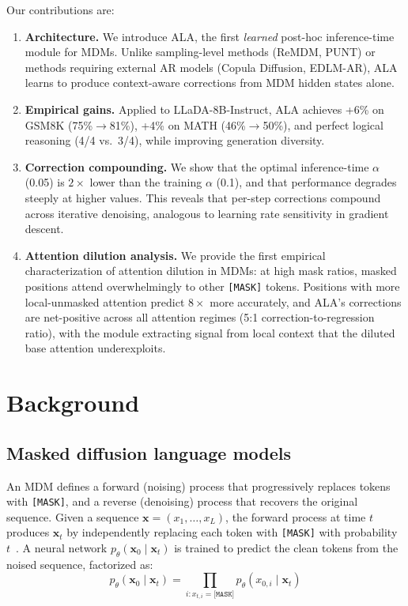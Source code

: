 \documentclass{article} %
\begin{document}
Our contributions are:
\begin{enumerate}
    \item \textbf{Architecture.} We introduce ALA, the first \emph{learned} post-hoc inference-time module for MDMs. Unlike sampling-level methods (ReMDM, PUNT) or methods requiring external AR models (Copula Diffusion, EDLM-AR), ALA learns to produce context-aware corrections from MDM hidden states alone.
    \item \textbf{Empirical gains.} Applied to LLaDA-8B-Instruct, ALA achieves +6\% on GSM8K (75\%$\to$81\%), +4\% on MATH (46\%$\to$50\%), and perfect logical reasoning (4/4 vs.\ 3/4), while improving generation diversity.
    \item \textbf{Correction compounding.} We show that the optimal inference-time $\alpha$ (0.05) is $2\times$ lower than the training $\alpha$ (0.1), and that performance degrades steeply at higher values. This reveals that per-step corrections compound across iterative denoising, analogous to learning rate sensitivity in gradient descent.
    \item \textbf{Attention dilution analysis.} We provide the first empirical characterization of attention dilution in MDMs: at high mask ratios, masked positions attend overwhelmingly to other \texttt{[MASK]} tokens. Positions with more local-unmasked attention predict $8\times$ more accurately, and ALA's corrections are net-positive across all attention regimes (5:1 correction-to-regression ratio), with the module extracting signal from local context that the diluted base attention underexploits.
\end{enumerate}


\section{Background}
\label{sec:background}

\subsection{Masked diffusion language models}

An MDM defines a forward (noising) process that progressively replaces tokens with \texttt{[MASK]}, and a reverse (denoising) process that recovers the original sequence.
Given a sequence $\mathbf{x} = (x_1, \ldots, x_L)$, the forward process at time $t$ produces $\mathbf{x}_t$ by independently replacing each token with \texttt{[MASK]} with probability $t$~\citep{austin2021structured, sahoo2024simple}.
A neural network $p_\theta(\mathbf{x}_0 \mid \mathbf{x}_t)$ is trained to predict the clean tokens from the noised sequence, factorized as:
\begin{equation}
    p_\theta(\mathbf{x}_0 \mid \mathbf{x}_t) = \prod_{i : x_{t,i} = \texttt{[MASK]}} p_\theta(x_{0,i} \mid \mathbf{x}_t)
    \label{eq:ci}
\end{equation}
\end{document}
